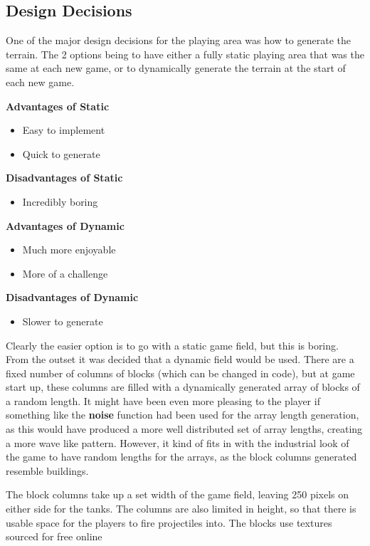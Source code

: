 \documentclass[12pt]{article}
\begin{document}
\subsection{Design Decisions}
One of the major design decisions for the playing area was how to generate the terrain. The 2 options being to have either a fully static playing area that was the same at each new game, or to dynamically generate the terrain at the start of each new game. \par
\begin{minipage}[t]{0.5\textwidth}
\textbf{Advantages of Static}
\begin{itemize}
\item Easy to implement
\item Quick to generate
\end{itemize}
\textbf{Disadvantages of Static}
\begin{itemize}
\item Incredibly boring
\end{itemize}
\end{minipage}
\begin{minipage}[t]{0.5\textwidth}
\textbf{Advantages of Dynamic}
\begin{itemize}
\item Much more enjoyable
\item More of a challenge
\end{itemize}
\textbf{Disadvantages of Dynamic}
\begin{itemize}
\item Slower to generate
\end{itemize}
\end{minipage}
\par 
Clearly the easier option is to go with a static game field, but this is boring. From the outset it was decided that a dynamic field would be used. There are a fixed number of columns of blocks (which can be changed in code), but at game start up, these columns are filled with a dynamically generated array of blocks of a random length. It might have been even more pleasing to the player if something like the \textbf{noise} function had been used for the array length generation, as this would have produced a more well distributed set of array lengths, creating a more wave like pattern. However, it kind of fits in with the industrial look of the game to have random lengths for the arrays, as the block columns generated resemble buildings.
\par 
The block columns take up a set width of the game field, leaving 250 pixels on either side for the tanks. The columns are also limited in height, so that there is usable space for the players to fire projectiles into. The blocks use textures sourced for free online \cite{playTextures}
\end{document}
